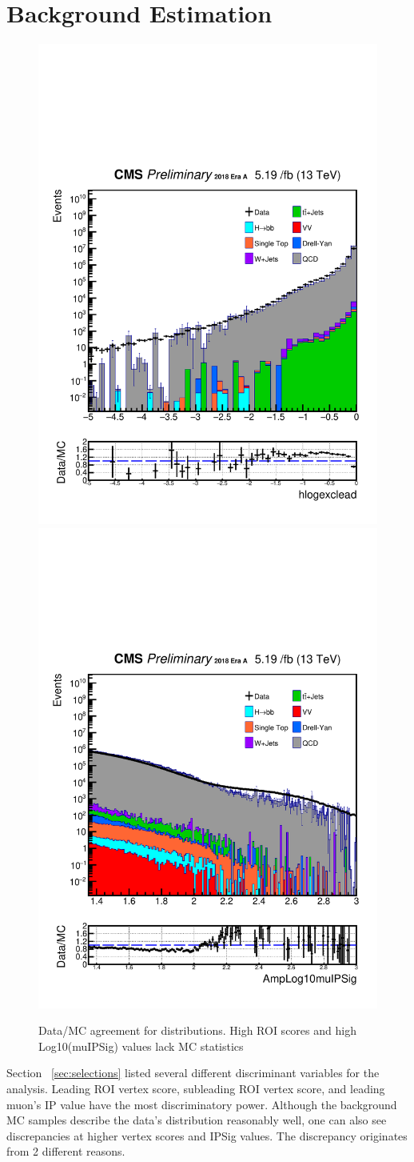 \clearpage
\chapter{Background Estimation}\label{sec:estimate}

\begin{figure}[h!]
  \label{fig:DataMCscore5}
  \centering
  \includegraphics[width=0.40\linewidth]{figs/Data_log_Oct6ANVars_MS-15_ctauS-10_hlogexclead.pdf}
  \includegraphics[width=0.40\linewidth]{figs/Data_log_Oct6ANVars_MS-15_ctauS-10_AmpLog10muIPSig.pdf}
	\caption{Data/MC agreement for distributions. High ROI scores and high Log10(muIPSig) values lack MC statistics}

\end{figure}
Section ~\ref{sec:selections} listed several different discriminant variables for the analysis.
Leading ROI vertex score, subleading ROI vertex score, and leading muon's IP value have the most discriminatory power.
Although the background MC samples describe the data's distribution reasonably well, one can also see discrepancies at higher vertex scores and IPSig values.
The discrepancy originates from 2 different reasons.
